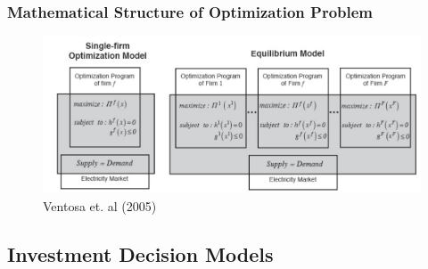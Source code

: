 \begin{frame}
\frametitle{Mathematical Structure of Optimization Problem}
\begin{figure}[h]
\centering
\includegraphics[width=1.\textwidth]{introduction/ventosa2.pdf}
    \caption{Ventosa et. al (2005)}
    \label{fig:ventosa2}            
\end{figure}
\end{frame}

\subsection{Investment Decision Models}

